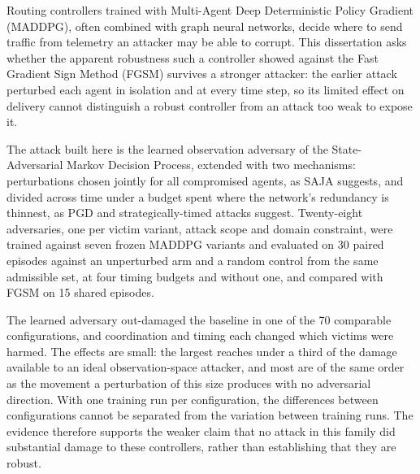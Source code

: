 
%

Routing controllers trained with Multi-Agent Deep Deterministic Policy Gradient
(MADDPG), often combined with graph neural networks, decide where to send traffic from
telemetry an attacker may be able to corrupt. This dissertation asks whether the
apparent robustness such a controller showed against the Fast Gradient Sign Method
(FGSM) survives a stronger attacker: the earlier attack perturbed each agent in
isolation and at every time step, so its limited effect on delivery cannot distinguish a
robust controller from an attack too weak to expose it.

The attack built here is the learned observation adversary of the State-Adversarial
Markov Decision Process, extended with two mechanisms: perturbations chosen jointly for
all compromised agents, as SAJA suggests, and divided across time under a budget spent
where the network's redundancy is thinnest, as PGD and strategically-timed attacks
suggest. Twenty-eight adversaries, one per victim variant, attack scope and domain
constraint, were trained against seven frozen MADDPG variants and evaluated on 30 paired
episodes against an unperturbed arm and a random control from the same admissible set,
at four timing budgets and without one, and compared with FGSM on 15 shared episodes.

The learned adversary out-damaged the baseline in one of the 70 comparable
configurations, and coordination and timing each changed which victims were harmed. The
effects are small: the largest reaches under a third of the damage available to an ideal
observation-space attacker, and most are of the same order as the movement a
perturbation of this size produces with no adversarial direction. With one training run
per configuration, the differences between configurations cannot be separated from the
variation between training runs. The evidence therefore supports the weaker claim that
no attack in this family did substantial damage to these controllers, rather than
establishing that they are robust.

